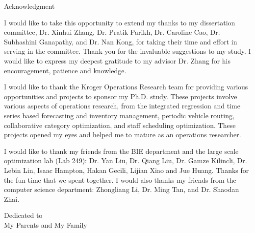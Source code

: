 \documentclass[12pt,english]{report}
\begin{document}
\begin{doublespace}
    \tableofcontents
    \listoffigures
    \listoftables
\end{doublespace}
%
\newpage
\thispagestyle{plain}
\setlength{\parindent}{0em}
\begin{center}
    {\huge Acknowledgment}
\end{center}

\setlength{\parindent}{2em}

I would like to take this opportunity to extend my thanks 
to my dissertation committee,  Dr. Xinhui Zhang, Dr. 
Pratik Parikh, Dr. Caroline Cao, Dr. Subhashini 
Ganapathy, and Dr. Nan Kong, for taking their time and effort 
in serving in the committee. Thank you for the invaluable 
suggestions to my study.  I would like to express my 
deepest gratitude to my advisor Dr. Zhang for his 
encouragement, patience and knowledge.

I would like to thank the Kroger Operations Research team 
for providing various opportunities and projects to 
sponsor my Ph.D. study.  These projects involve various 
aspects of operations research, from the integrated 
regression and time series based forecasting and 
inventory management, periodic vehicle routing, 
collaborative category optimization, and staff scheduling 
optimization.  These projects opened my eyes and helped 
me to mature as an operations researcher.

I would like to thank my friends from the BIE department 
and the large scale optimization lab (Lab 249): Dr. Yan 
Liu, Dr. Qiang Liu, Dr. Gamze Kilincli, Dr. Lebin Lin, Isaac Hampton, 
Hakan Gecili, Lijian Xiao and Jue Huang. Thanks for the 
fun time that we spent together. I would also thanks my 
friends from the computer science department: Zhongliang 
Li, Dr. Ming Tan, and Dr. Shaodan Zhai.

%
\newpage
\thispagestyle{plain}
\vspace*{3in}
\begin{center}
    Dedicated to\\
    My Parents and My Family
\end{center}


\newpage
\setcounter{page}{1}
\setlength{\parindent}{2em}
\end{document}
